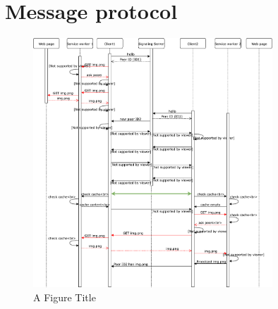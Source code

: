 \subsection{\schulCloud}

\section{Message protocol}

\begin{figure}[!h]
	\centering
	\includegraphics[width=0.8\textwidth]{figures/SequenceDiagram}
	\caption[A Figure Short-Title]{A Figure Title}
	\label{fig:sequenceDiagram}
\end{figure}


